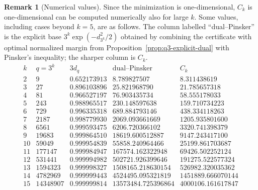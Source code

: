 \documentclass[10pt,a4paper]{amsart}
\theoremstyle{definition}
\newtheorem{remark}[theorem]{Remark}
\newcommand{\1}{\mathbf 1}
\begin{document}
\begin{remark}[Numerical values]\label{rem:q3-dual-certificate}
Since the minimization is one-dimensional, $C_k$ is one-dimensional can be computed numerically also for large $k$.  Some values, including cases beyond $k=5$, are as follows.  The column labelled ``dual--Pinsker'' is the explicit base
$3^k\exp(-d_{3^k}^2/2)$ obtained by combining the certificate with optimal normalized margin from Proposition~\ref{prop:q3-explicit-dual} with Pinsker's inequality; the sharper column is $C_k$.
\[
\begin{array}{c|r|c|r|r}
 k & q=3^k & 3d_q & \text{dual--Pinsker} & C_k\\
\hline
 2 & 9    & 0.652173913 & 8.789827507 & 8.311438619\\
 3 & 27   & 0.896103896 & 25.821968790 & 21.785657318\\
 4 & 81   & 0.966527197 & 76.903435734 & 58.555178033\\
 5 & 243  & 0.988965517 & 230.148597638 & 159.710734223\\
 6 & 729  & 0.996335318 & 689.884793146 & 438.334118263\\
 7 & 2187 & 0.998779930 & 2069.093661669 & 1205.935801600\\
 8 & 6561 & 0.999593475 & 6206.720366102 & 3320.741398379\\
 9  & 19683    & 0.999864510 & 18619.600512887 & 9147.243417100 \\
10 & 59049    & 0.999954839 & 55858.240964466 & 25199.861703687 \\
11 & 177147   & 0.999984947 & 167574.162322948 & 69426.502252124 \\
12 & 531441   & 0.999994982 & 502721.926399646 & 191275.522577324 \\
13 & 1594323  & 0.999998327 & 1508165.218630154 & 526982.320035362 \\
14 & 4782969  & 0.999999443 & 4524495.095321819 & 1451889.666070144 \\
15 & 14348907 & 0.999999814 & 13573484.725396864 & 4000106.161617847 \\


\end{array}\]
\end{remark}
\end{document}
